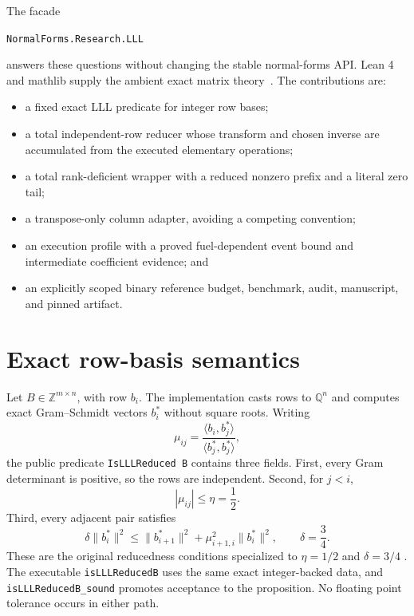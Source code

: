 \documentclass[11pt]{article}
\newcommand{\code}[1]{\texttt{#1}}
\newcommand{\Z}{\mathbb{Z}}
\newcommand{\Q}{\mathbb{Q}}
\begin{document}
The facade
\begin{center}
  \code{NormalForms.Research.LLL}
\end{center}
answers these questions without changing the stable normal-forms API.  Lean 4
and mathlib supply the ambient exact matrix theory~\citep{deMouraUllrich2021Lean4,
mathlib2020}.  The contributions are:
\begin{itemize}
  \item a fixed exact LLL predicate for integer row bases;
  \item a total independent-row reducer whose transform and chosen inverse
        are accumulated from the executed elementary operations;
  \item a total rank-deficient wrapper with a reduced nonzero prefix and a
        literal zero tail;
  \item a transpose-only column adapter, avoiding a competing convention;
  \item an execution profile with a proved fuel-dependent event bound and
        intermediate coefficient evidence; and
  \item an explicitly scoped binary reference budget, benchmark, audit,
        manuscript, and pinned artifact.
\end{itemize}

\section{Exact row-basis semantics}

Let $B\in\Z^{m\times n}$, with row $b_i$.  The implementation casts rows to
$\Q^n$ and computes exact Gram--Schmidt vectors $b_i^*$ without square roots.
Writing
\[
  \mu_{ij}=\frac{\langle b_i,b_j^*\rangle}
                   {\langle b_j^*,b_j^*\rangle},
\]
the public predicate \code{IsLLLReduced B} contains three fields.  First,
every Gram determinant is positive, so the rows are independent.  Second,
for $j<i$,
\[
  |\mu_{ij}|\le\eta=\frac12.
\]
Third, every adjacent pair satisfies
\[
  \delta\lVert b_i^*\rVert^2
  \le
  \lVert b_{i+1}^*\rVert^2+
  \mu_{i+1,i}^2\lVert b_i^*\rVert^2,
  \qquad \delta=\frac34.
\]
These are the original reducedness conditions specialized to
$\eta=1/2$ and $\delta=3/4$
\citep[Section 1, equations (1.4)--(1.5)]{lenstraLenstraLovasz1982}.
The executable \code{isLLLReducedB} uses the same exact integer-backed data,
and \code{isLLLReducedB\_sound} promotes acceptance to the proposition.  No
floating point tolerance occurs in either path.
\end{document}
